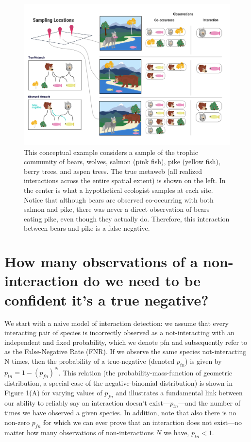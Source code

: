 \documentclass[11pt]{article}
\makeatletter
\def\maxwidth{\ifdim\Gin@nat@width>\linewidth\linewidth
\else\Gin@nat@width\fi}
\let\Oldincludegraphics\includegraphics
\renewcommand{\includegraphics}[1]{\Oldincludegraphics[width=\maxwidth]{#1}}
\makeatother
\begin{document}
\begin{figure}
\hypertarget{fig:concept}{%
\centering
\includegraphics{./figures/concept.png}
\caption{This conceptual example considers a sample of the trophic
community of bears, wolves, salmon (pink fish), pike (yellow fish),
berry trees, and aspen trees. The true metaweb (all realized
interactions across the entire spatial extent) is shown on the left. In
the center is what a hypothetical ecologist samples at each site. Notice
that although bears are observed co-occurring with both salmon and pike,
there was never a direct observation of bears eating pike, even though
they actually do. Therefore, this interaction between bears and pike is
a false negative.}\label{fig:concept}
}
\end{figure}

\hypertarget{how-many-observations-of-a-non-interaction-do-we-need-to-be-confident-its-a-true-negative}{%
\section{How many observations of a non-interaction do we need to be
confident it's a true
negative?}\label{how-many-observations-of-a-non-interaction-do-we-need-to-be-confident-its-a-true-negative}}

We start with a naive model of interaction detection: we assume that
every interacting pair of species is incorrectly observed as a
not-interacting with an independent and fixed probability, which we
denote pfn and subsequently refer to as the False-Negative Rate (FNR).
If we observe the same species not-interacting N times, then the
probability of a true-negative (denoted \(p_{tn}\)) is given by
\(p_{tn}=1-(p_{fn})^N\). This relation (the probability-mass-function of
geometric distribution, a special case of the negative-binomial
distribution) is shown in Figure 1(A) for varying values of \(p_{fn}\)
and illustrates a fundamental link between our ability to reliably say
an interaction doesn't exist---\(p_{tn}\)---and the number of times we
have observed a given species. In addition, note that also there is no
non-zero \(p_{fn}\) for which we can ever prove that an interaction does
not exist---no matter how many observations of non-interactions \(N\) we
have, \(p_{tn}<1\).
\end{document}
